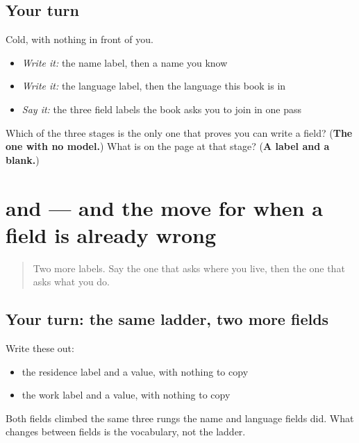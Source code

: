 \subsection*{Your turn}
Cold, with nothing in front of you.

\begin{itemize}
\raggedright
  \item \emph{Write it:} the name label, then a name you know
  \item \emph{Write it:} the language label, then the language this book is in
  \item \emph{Say it:} the three field labels the book asks you to join in one pass
\end{itemize}

\begin{tcolorbox}[breakable,colback=teal!4,colframe=teal!35!black,title={Before you move on}]
Which of the three stages is the only one that proves you can write a field? (\textbf{The one with no model.}) What is on the page at that stage? (\textbf{A label and a blank.})
\end{tcolorbox}
\section[\texorpdfstring{\pa{ਰਿਹਾਇਸ਼} · \pa{ਕੰਮ} (rihāish · kamm)}{ਰਿਹਾਇਸ਼ · ਕੰਮ (rihāish · kamm)}]{ and  — and the move for when a field is already wrong}

\label{lesson:PA-R48-forms-residence-and-work}



\begin{quote}
Two more labels. Say the one that asks where you live, then the one that asks what you do.
\end{quote}

\subsection*{Your turn: the same ladder, two more fields}
Write these out:

\begin{itemize}
\raggedright
  \item the residence label and a value, with nothing to copy
  \item the work label and a value, with nothing to copy
\end{itemize}

Both fields climbed the same three rungs the name and language fields did. What changes between fields is the vocabulary, not the ladder.

